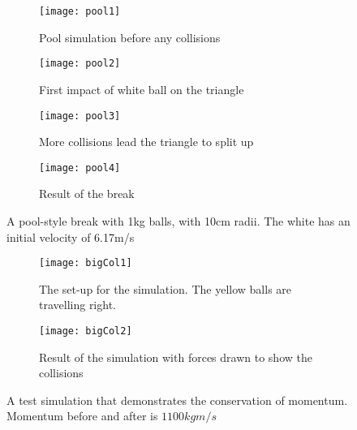 	\begin{figure}[p]
		\centering
		\begin{subfigure}{0.49\textwidth}
			\centering
			\texttt{[image: pool1]}
			\caption{Pool simulation before any collisions}
			\label{fig:colEval1Sub1}
		\end{subfigure}
		\begin{subfigure}{0.49\textwidth}
			\centering
			\texttt{[image: pool2]}
			\caption{First impact of white ball on the triangle} 
			\label{fig:colEval1Sub2}
		\end{subfigure}	
		\begin{subfigure}{0.49\textwidth}
			\centering
			\texttt{[image: pool3]}
			\caption{More collisions lead the triangle to split up} 
			\label{fig:colEval1Sub3}
		\end{subfigure}	
		\begin{subfigure}{0.49\textwidth}
			\centering
			\texttt{[image: pool4]}
			\caption{Result of the break} 
			\label{fig:colEval1Sub4}
		\end{subfigure}	
		\caption{A pool-style break with 1kg balls, with 10cm radii. The white has an initial velocity of 6.17m/s}
		\label{fig:colEval1}
	\end{figure}
	
	\begin{figure}[p]
		\centering
		\begin{subfigure}{0.49\textwidth}
			\centering
			\texttt{[image: bigCol1]}
			\caption{The set-up for the simulation. The yellow balls are travelling right.}
			\label{fig:colEval2Sub1}
		\end{subfigure}
		\begin{subfigure}{0.49\textwidth}
			\centering
			\texttt{[image: bigCol2]}
			\caption{Result of the simulation with forces drawn to show the collisions} 
			\label{fig:colEval2Sub2}
		\end{subfigure}	
		\caption{A test simulation that demonstrates the conservation of momentum. Momentum before and after is $1100kgm/s$}
		\label{fig:colEval2}
	\end{figure}
